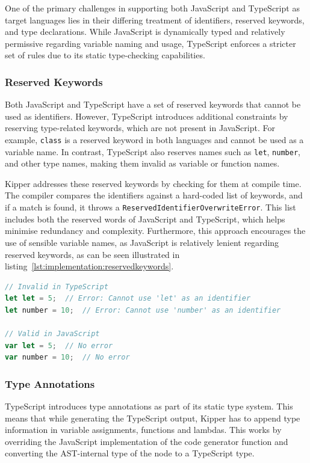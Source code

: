 One of the primary challenges in supporting both JavaScript and TypeScript as target languages lies in their differing treatment of identifiers, reserved keywords, and type declarations. While JavaScript is dynamically typed and relatively permissive regarding variable naming and usage, TypeScript enforces a stricter set of rules due to its static type-checking capabilities.

\subsubsection{Reserved Keywords}

Both JavaScript and TypeScript have a set of reserved keywords that cannot be used as identifiers. However, TypeScript introduces additional constraints by reserving type-related keywords, which are not present in JavaScript. For example, \lstinline|class| is a reserved keyword in both languages and cannot be used as a variable name. In contrast, TypeScript also reserves names such as \lstinline|let|, \lstinline|number|, and other type names, making them invalid as variable or function names.

Kipper addresses these reserved keywords by checking for them at compile time. The compiler compares the identifiers against a hard-coded list of keywords, and if a match is found, it throws a \lstinline|ReservedIdentifierOverwriteError|. This list includes both the reserved words of JavaScript and TypeScript, which helps minimise redundancy and complexity. Furthermore, this approach encourages the use of sensible variable names, as JavaScript is relatively lenient regarding reserved keywords, as can be seen illustrated in listing~\ref{lst:implementation:reservedkeywords}.

\begin{lstlisting}[language=TypeScript,caption=Reserved Keywords in TS and JS,label=lst:implementation:reservedkeywords]
// Invalid in TypeScript
let let = 5;  // Error: Cannot use 'let' as an identifier
let number = 10;  // Error: Cannot use 'number' as an identifier

// Valid in JavaScript
var let = 5;  // No error
var number = 10;  // No error
\end{lstlisting}

\subsubsection{Type Annotations}

TypeScript introduces type annotations as part of its static type system. This means that while generating the TypeScript output, Kipper has to append type information in variable assignments, functions and lambdas. This works by overriding the JavaScript implementation of the code generator function and converting the AST-internal type of the node to a TypeScript type. 

